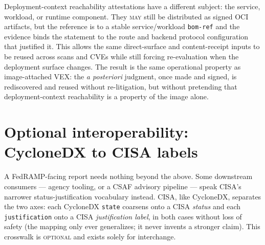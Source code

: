 \documentclass[11pt]{article}
\newcommand{\code}[1]{\texttt{#1}}
\newcommand{\rfckw}[1]{\textsc{#1}}
\begin{document}
Deployment-context reachability attestations have a different subject: the service,
workload, or runtime component. They \rfckw{may} still be distributed as signed OCI
artifacts, but the reference is to a stable service/workload \code{bom-ref} and the
evidence binds the statement to the route and backend protocol configuration that
justified it. This allows the same direct-surface and content-receipt inputs to be
reused across scans and CVEs
while still forcing re-evaluation when the deployment surface changes. The result is the
same operational property as image-attached VEX: the \emph{a posteriori} judgment, once
made and signed, is rediscovered and reused without re-litigation, but without pretending
that deployment-context reachability is a property of the image alone.

\section{Optional interoperability: CycloneDX to CISA labels}
A FedRAMP-facing report needs nothing beyond the above. Some downstream consumers ---
agency tooling, or a CSAF advisory pipeline --- speak CISA's narrower
status-justification vocabulary instead. CISA, like CycloneDX, separates the two axes:
each CycloneDX \code{state} coarsens onto a CISA \emph{status} and each
\code{justification} onto a CISA \emph{justification label}, in both cases without loss
of safety (the mapping only ever generalizes; it never invents a stronger claim). This
crosswalk is \rfckw{optional} and exists solely for interchange.
\end{document}
